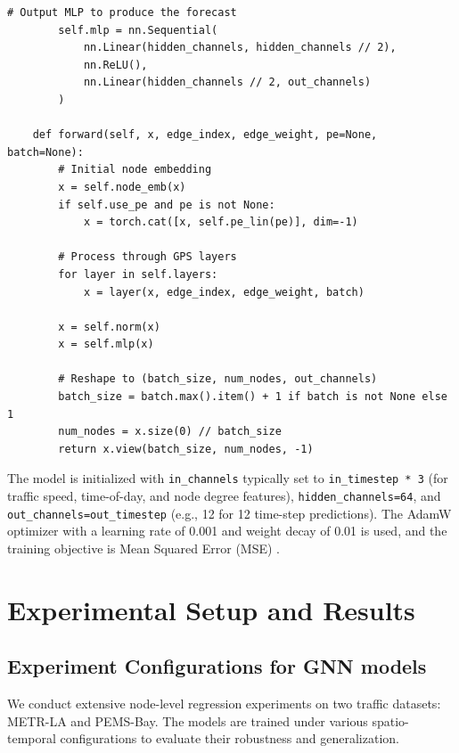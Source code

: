 \documentclass[runningheads]{llncs}
\begin{document}
\begin{lstlisting}[style=customPython]
        # Output MLP to produce the forecast
        self.mlp = nn.Sequential(
            nn.Linear(hidden_channels, hidden_channels // 2),
            nn.ReLU(),
            nn.Linear(hidden_channels // 2, out_channels)
        )
        
    def forward(self, x, edge_index, edge_weight, pe=None, batch=None):
        # Initial node embedding
        x = self.node_emb(x)
        if self.use_pe and pe is not None:
            x = torch.cat([x, self.pe_lin(pe)], dim=-1)
        
        # Process through GPS layers
        for layer in self.layers:
            x = layer(x, edge_index, edge_weight, batch)
        
        x = self.norm(x)
        x = self.mlp(x)
        
        # Reshape to (batch_size, num_nodes, out_channels)
        batch_size = batch.max().item() + 1 if batch is not None else 1
        num_nodes = x.size(0) // batch_size
        return x.view(batch_size, num_nodes, -1)
\end{lstlisting}
The model is initialized with \texttt{in\_channels} typically set to \texttt{in\_timestep * 3} (for traffic speed, time-of-day, and node degree features), \texttt{hidden\_channels=64}, and \texttt{out\_channels=out\_timestep} (e.g., 12 for 12 time-step predictions). The AdamW optimizer with a learning rate of 0.001 and weight decay of 0.01 is used, and the training objective is Mean Squared Error (MSE) .

\section{Experimental Setup and Results}

\subsection{Experiment Configurations for GNN models}
We conduct extensive node-level regression experiments on two traffic datasets: METR-LA and PEMS-Bay. The models are trained under various spatio-temporal configurations to evaluate their robustness and generalization.
\end{document}
